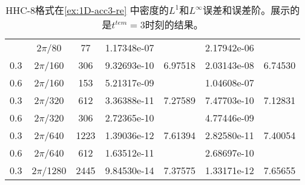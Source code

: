 \begin{table}[htbp]
	\caption{HHC-8格式在\cref{ex:1D-acc3-re} 中密度的$L^1$和$L^\infty$误差和误差阶。展示的是$t^{tem} = 3$时刻的结果。}
	\label{ta:1D-ex3-HHC8}
	\centering
	\begin{tabular}{ccccccc}
		\toprule
		\titleintable
		\midrule
		0.6 & $2\pi$/80   & 77   & 1.17348e-07 &         & 2.17942e-06 &         \\
		0.3 & $2\pi$/160  & 306  & 9.32693e-10 & 6.97518 & 2.03143e-08 & 6.74530 \\
		\midrule
		0.6 & $2\pi$/160  & 153  & 5.21317e-09 &         & 1.04608e-07 &         \\
		0.3 & $2\pi$/320  & 612  & 3.36388e-11 & 7.27589 & 7.47703e-10 & 7.12831 \\
		\midrule
		0.6 & $2\pi$/320  & 306  & 2.72365e-10 &         & 4.77446e-09 &         \\
		0.3 & $2\pi$/640  & 1223 & 1.39036e-12 & 7.61394 & 2.82580e-11 & 7.40054 \\
		\midrule
		0.6 & $2\pi$/640  & 612  & 1.63512e-11 &         & 2.68697e-10 &         \\
		0.3 & $2\pi$/1280 & 2445 & 9.84530e-14 & 7.37575 & 1.33171e-12 & 7.65655 \\
		\bottomrule
	\end{tabular}
\end{table}
\undef\titleintable